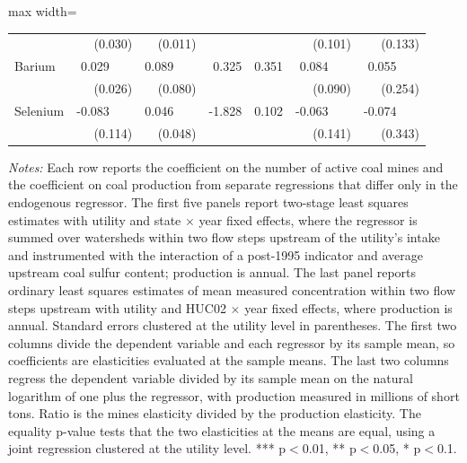 \begin{table}[htbp]
{\begin{adjustbox}{max width=\linewidth}
\begin{tabular}{lrrrrrr}
 & (\phantom{-}0.030)\phantom{$^{***}$} & (\phantom{-}0.011)\phantom{$^{***}$} &  &  & (\phantom{-}\phantom{0}0.101)\phantom{$^{***}$} & (\phantom{-}\phantom{0}0.133)\phantom{$^{***}$} \\
Barium & \phantom{(}\phantom{-}0.029$^{\phantom{*}\phantom{*}\phantom{*}}$ & \phantom{(}\phantom{-}0.089$^{\phantom{*}\phantom{*}\phantom{*}}$ & \phantom{(}\phantom{-}0.325\phantom{$^{***}$} & \phantom{(}\phantom{-}0.351\phantom{$^{***}$} & \phantom{(}\phantom{-}\phantom{0}0.084$^{\phantom{*}\phantom{*}\phantom{*}}$ & \phantom{(}\phantom{-}\phantom{0}0.055$^{\phantom{*}\phantom{*}\phantom{*}}$ \\
 & (\phantom{-}0.026)\phantom{$^{***}$} & (\phantom{-}0.080)\phantom{$^{***}$} &  &  & (\phantom{-}\phantom{0}0.090)\phantom{$^{***}$} & (\phantom{-}\phantom{0}0.254)\phantom{$^{***}$} \\
Selenium & \phantom{(}-0.083$^{\phantom{*}\phantom{*}\phantom{*}}$ & \phantom{(}\phantom{-}0.046$^{\phantom{*}\phantom{*}\phantom{*}}$ & \phantom{(}-1.828\phantom{$^{***}$} & \phantom{(}\phantom{-}0.102\phantom{$^{***}$} & \phantom{(}-\phantom{0}0.063$^{\phantom{*}\phantom{*}\phantom{*}}$ & \phantom{(}-\phantom{0}0.074$^{\phantom{*}\phantom{*}\phantom{*}}$ \\
 & (\phantom{-}0.114)\phantom{$^{***}$} & (\phantom{-}0.048)\phantom{$^{***}$} &  &  & (\phantom{-}\phantom{0}0.141)\phantom{$^{***}$} & (\phantom{-}\phantom{0}0.343)\phantom{$^{***}$} \\
\bottomrule
\end{tabular}
\end{adjustbox}
}
\begin{minipage}{\linewidth}
\vspace{4pt}
\footnotesize
\raggedright
\textit{Notes:} Each row reports the coefficient on the number of active coal mines and the coefficient on coal production from separate regressions that differ only in the endogenous regressor. The first five panels report two-stage least squares estimates with utility and state $\times$ year fixed effects, where the regressor is summed over watersheds within two flow steps upstream of the utility's intake and instrumented with the interaction of a post-1995 indicator and average upstream coal sulfur content; production is annual. The last panel reports ordinary least squares estimates of mean measured concentration within two flow steps upstream with utility and HUC02 $\times$ year fixed effects, where production is annual. Standard errors clustered at the utility level in parentheses. The first two columns divide the dependent variable and each regressor by its sample mean, so coefficients are elasticities evaluated at the sample means. The last two columns regress the dependent variable divided by its sample mean on the natural logarithm of one plus the regressor, with production measured in millions of short tons. Ratio is the mines elasticity divided by the production elasticity. The equality p-value tests that the two elasticities at the means are equal, using a joint regression clustered at the utility level. *** p$<$0.01, ** p$<$0.05, * p$<$0.1.
\end{minipage}
\end{table}

